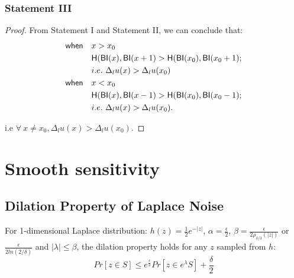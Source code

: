 \subsubsection{Statement III}
\begin{proof}
From Statement I and Statement II, we can conclude that:
\begin{equation*}
\begin{split}
\mathsf{when} \quad	& x > x_0 \\
					& \mathsf{H}(\mathsf{BI}(x), \mathsf{BI}(x + 1) > \mathsf{H}(\mathsf{BI}(x_0), \mathsf{BI}(x_0 + 1); \\
					& i.e.\ \Delta_l u(x) > \Delta_l u(x_0)\\
\mathsf{when} \quad	& x < x_0 \\
					& \mathsf{H}(\mathsf{BI}(x), \mathsf{BI}(x - 1)  > \mathsf{H}(\mathsf{BI}(x_0), \mathsf{BI}(x_0 - 1); \\
					& i.e.\ \Delta_l u(x) > \Delta_l u(x_0).\\
\end{split}
\end{equation*}

i.e $\forall \ x \neq x_0, \Delta_l u(x) > \Delta_l u(x_0)$.

\end{proof}

\section{Smooth sensitivity}
\label{sec_smoo}

\subsection{Dilation Property of Laplace Noise}
\label{sec_Dila}
\begin{lem}
For 1-dimensional Laplace distribution: $h(z) = \frac{1}{2} e^{-|z|}$, $\alpha = \frac{\epsilon}{2}$, $\beta = \frac{\epsilon}{2 \rho_{\delta/3}(|z|)}$ or $ \frac{\epsilon}{2 ln(2/\delta)}$ and $|\lambda| \leq \beta$, the dilation property holds for any $z$ sampled from $h$:
\begin{equation*}
Pr[z \in S] \leq e^{\frac{\epsilon}{2}} Pr[z \in e^{\lambda} S] + \frac{\delta}{2}
\end{equation*}
\end{lem}

